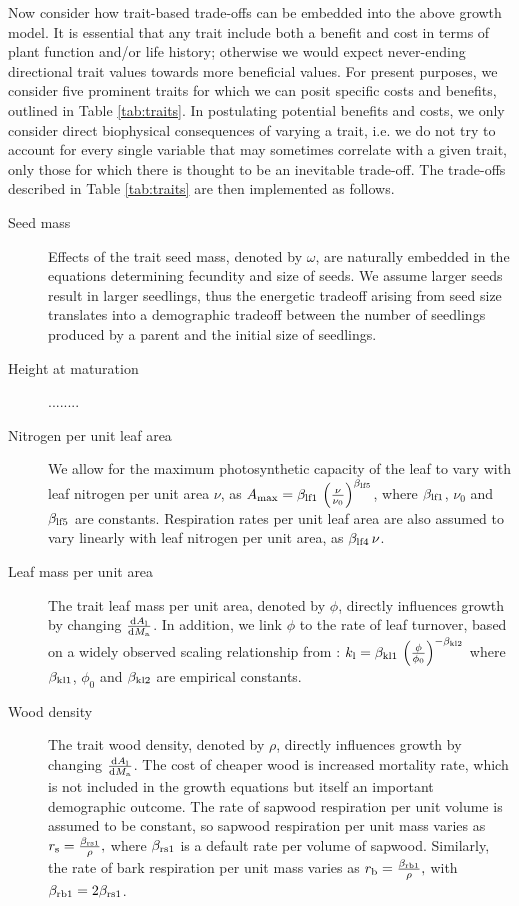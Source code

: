 \documentclass[a4paper,11pt]{article}
\begin{document}
Now consider how trait-based trade-offs can be embedded into the above growth model. It is essential that any trait include both a benefit and cost in terms of plant function and/or life history; otherwise we would expect never-ending directional trait values towards more beneficial values. For present purposes, we consider five prominent traits for which we can posit specific costs and benefits, outlined in Table \ref{tab:traits}. In postulating potential benefits and costs, we only consider direct biophysical consequences of varying a trait, i.e. we do not try to account for every single variable that may sometimes correlate with a given trait, only those for which there is thought to be an inevitable trade-off. The trade-offs described in Table \ref{tab:traits} are then implemented as follows.
\begin{description}
\item[Seed mass] Effects of the trait seed mass, denoted by $\omega$, are naturally embedded in the equations determining fecundity and size of seeds. We assume larger seeds result in larger seedlings, thus the energetic tradeoff arising from seed size translates into a demographic tradeoff between the number of seedlings produced by a parent and the initial size of seedlings.
\item[Height at maturation] ........
\item[Nitrogen per unit leaf area] We allow for the maximum photosynthetic capacity of the leaf to vary with leaf nitrogen per unit area $\nu$, as $A_{\rm max} = \beta_{{\rm lf1}} \, \left(\frac{\nu}{\nu_0}\right)^{\beta_{{\rm lf5}}}$, where $\beta_{{\rm lf1}}$, $\nu_0$ and $\beta_{{\rm lf5}}$ are constants. Respiration rates per unit leaf area are also assumed to vary linearly with leaf nitrogen per unit area, as $\beta_{{\rm lf4}}\, \nu$.
\item[Leaf mass per unit area] The trait leaf mass per unit area, denoted by $\phi$, directly influences growth by changing $\frac{{\rm d}A_{\rm l}}{{\rm d}M_{\rm a}}$. In addition, we link $\phi$ to the rate of leaf turnover, based on a widely observed scaling relationship from \citet{Wright-2004}: $k_{\rm l} = \beta_{{\rm kl1}} \, \left(\frac{\phi}{\phi_0}\right)^{-\beta_{{\rm kl2}}}$ where $\beta_{{\rm kl1}}$, $\phi_0$ and $\beta_{{\rm kl2}}$ are empirical constants.
\item[Wood density] The trait wood density, denoted by $\rho$, directly influences growth by changing $\frac{{\rm d}A_{\rm l}}{{\rm d}M_{\rm a}}$. The cost of cheaper wood is increased mortality rate, which is not included in the growth equations but itself an important demographic outcome. The rate of sapwood respiration per unit volume is assumed to be constant, so sapwood respiration per unit mass varies as $r_{\rm s}  = \frac{\beta_{{\rm rs1}}}{\rho},$ where $\beta_{{\rm rs1}}$ is a default rate per volume of sapwood. Similarly, the rate of bark respiration per unit mass varies as $r_{\rm b} = \frac{\beta_{{\rm rb1}}}{\rho},$ with $\beta_{{\rm rb1}} = 2 \beta_{{\rm rs1}}$.
 \end{description}
\end{document}
